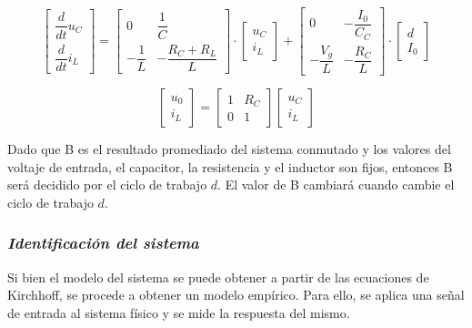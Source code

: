 \vspace{-0.5cm}
\begin{equation}
    \begin{bmatrix}
        \dfrac{d}{dt}u_C\\
        \dfrac{d}{dt}i_L
    \end{bmatrix}
    =
    \begin{bmatrix}
        0 & \dfrac{1}{C}\\
        -\dfrac{1}{L} & -\dfrac{R_C + R_L}{L}
    \end{bmatrix}
    \cdot
    \begin{bmatrix}
        u_C\\
        i_L
    \end{bmatrix}
    +
    \begin{bmatrix}
        0 & -\dfrac{I_0}{C_C}\\
        -\dfrac{V_g}{L} & -\dfrac{R_C}{L}
    \end{bmatrix}
    \cdot
    \begin{bmatrix}
        d\\
        I_0
    \end{bmatrix} 
\end{equation}

\vspace{-0.5cm}
\begin{equation}
    \begin{bmatrix}
        u_0\\
        i_L
    \end{bmatrix}
    =
    \begin{bmatrix}
        1 & R_C\\
        0 & 1
    \end{bmatrix}
    \begin{bmatrix}
        u_C\\
        i_L
    \end{bmatrix}
\end{equation}

Dado que B es el resultado promediado del sistema conmutado y los valores del voltaje de entrada,
el capacitor, la resistencia y el inductor son fijos, entonces B será decidido por el ciclo de
trabajo $d$. El valor de B cambiará cuando cambie el ciclo de trabajo $d$.



\subsubsection*{\it{Identificación del sistema}}
\vspace{-0.25cm}
Si bien el modelo del sistema se puede obtener a partir de las ecuaciones de Kirchhoff, se procede
a obtener un modelo empírico. Para ello, se aplica una señal de entrada al sistema físico y se
mide la respuesta del mismo.

